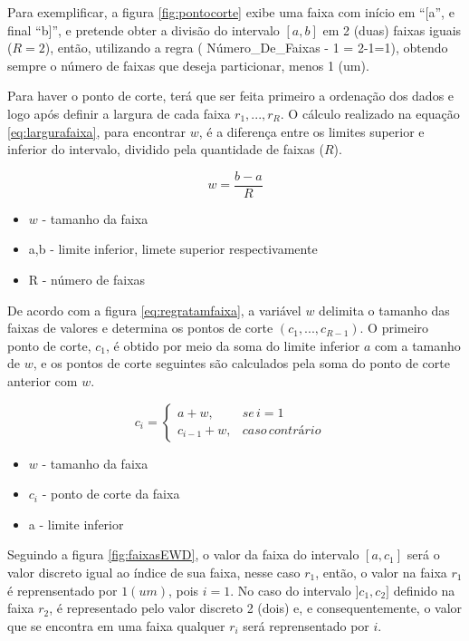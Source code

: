 Para exemplificar, a figura \ref{fig:pontocorte} exibe uma faixa com início em ``[a'', e final ``b]'', e pretende obter a divisão do intervalo ${[a,b]}$ em 2 (duas) faixas iguais (${R=2}$), então, utilizando a regra ( Número\_De\_Faixas - 1 =  2-1=1), obtendo sempre o número de faixas que deseja particionar, menos 1 (um).

Para haver o ponto de corte, terá que ser feita primeiro a ordenação dos dados e logo após definir a largura de cada faixa ${r_1,...,r_R}$. O cálculo realizado na equação \ref{eq:largurafaixa}, para encontrar ${w}$, é a diferença entre os limites superior e inferior do intervalo, dividido pela quantidade de faixas (${R}$).

\begin{equation}
 w = \frac{b-a}{R}
 \label{eq:largurafaixa}
\end{equation}
\begin{itemize}[noitemsep]
 \item ${w}$ - tamanho da faixa
 \item a,b - limite inferior, limete superior respectivamente
 \item R - número de faixas
\end{itemize}

De acordo com a figura \ref{eq:regratamfaixa}, a variável ${w}$ delimita o tamanho das faixas de valores e determina os pontos de corte ${(c_1,...,c_{R-1})}$. O primeiro ponto de corte, ${c_1}$, é obtido por meio da soma do limite inferior ${a}$ com a tamanho de ${w}$, e os pontos de corte seguintes são calculados pela soma do ponto de corte anterior com ${w}$.

\begin{equation}
c_i=\left\{\begin{matrix}
a+w, & se\, i=1 & \\ 
c_{i-1}+w,  & caso\, contrário & 
\end{matrix}\right.
 \label{eq:regratamfaixa}
\end{equation}
\begin{itemize}[noitemsep]
 \item ${w}$ - tamanho da faixa
 \item ${c_i}$ - ponto de corte da faixa
 \item a - limite inferior
\end{itemize}

Seguindo a figura \ref{fig:faixasEWD}, o valor da faixa do intervalo ${[a,c_1]}$ será o valor discreto igual ao índice de sua faixa, nesse caso ${r_1}$, então, o valor na faixa ${r_1}$ é reprensentado por ${1(um)}$, pois  ${i=1}$. No caso do intervalo ${]c_1,c_2]}$ definido na faixa  ${r_2}$, é representado pelo valor discreto 2 (dois) e, e consequentemente, o valor que se encontra em uma faixa qualquer ${r_i}$ será reprensentado por ${i}$.

